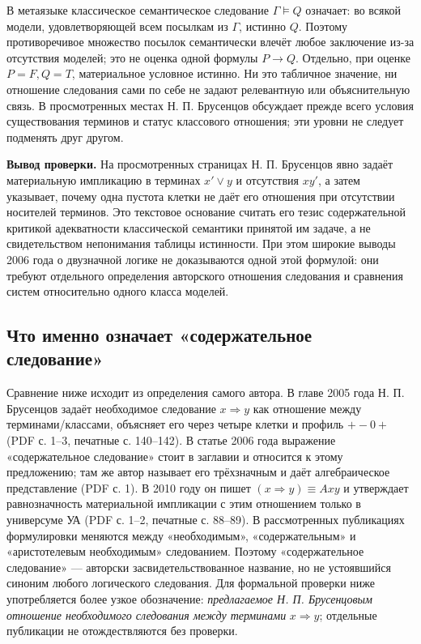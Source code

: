 \documentclass[12pt,a4paper]{article}
\begin{document}
В метаязыке классическое семантическое следование \(\Gamma\models Q\) означает: во всякой модели, удовлетворяющей всем посылкам из \(\Gamma\), истинно \(Q\). Поэтому противоречивое множество посылок семантически влечёт любое заключение из-за отсутствия моделей; это не оценка одной формулы \(P\to Q\). Отдельно, при оценке \(P=F,Q=T\), материальное условное истинно. Ни это табличное значение, ни отношение следования сами по себе не задают релевантную или объяснительную связь. В просмотренных местах Н. П. Брусенцов обсуждает прежде всего условия существования терминов и статус классового отношения; эти уровни не следует подменять друг другом.

\textbf{Вывод проверки.} На просмотренных страницах Н. П. Брусенцов явно задаёт материальную импликацию в терминах \(x'\lor y\) и отсутствия \(xy'\), а затем указывает, почему одна пустота клетки не даёт его отношения при отсутствии носителей терминов. Это текстовое основание считать его тезис содержательной критикой адекватности классической семантики принятой им задаче, а не свидетельством непонимания таблицы истинности. При этом широкие выводы 2006 года о двузначной логике не доказываются одной этой формулой: они требуют отдельного определения авторского отношения следования и сравнения систем относительно одного класса моделей.

\subsection*{Что именно означает «содержательное следование»}

Сравнение ниже исходит из определения самого автора. В главе 2005 года Н. П. Брусенцов задаёт необходимое следование \(x\Rightarrow y\) как отношение между терминами/классами, объясняет его через четыре клетки и профиль \(+-0+\) (PDF с. 1–3, печатные с. 140–142). В статье 2006 года выражение «содержательное следование» стоит в заглавии и относится к этому предложению; там же автор называет его трёхзначным и даёт алгебраическое представление (PDF с. 1). В 2010 году он пишет \((x\Rightarrow y)\equiv Axy\) и утверждает равнозначность материальной импликации с этим отношением только в универсуме УА (PDF с. 1–2, печатные с. 88–89). В рассмотренных публикациях формулировки меняются между «необходимым», «содержательным» и «аристотелевым необходимым» следованием. Поэтому «содержательное следование» — авторски засвидетельствованное название, но не устоявшийся синоним любого логического следования. Для формальной проверки ниже употребляется более узкое обозначение: \emph{предлагаемое Н. П. Брусенцовым отношение необходимого следования между терминами} \(x\Rightarrow y\); отдельные публикации не отождествляются без проверки.
\end{document}
